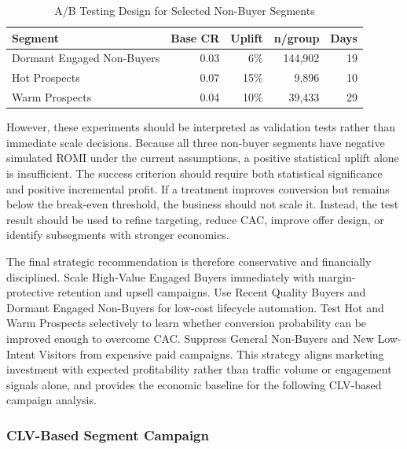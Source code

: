 \documentclass[conference]{IEEEtran}
\begin{document}
\begin{table}[H]
\centering
\caption{A/B Testing Design for Selected Non-Buyer Segments}
\label{tab:segment_ab_design}
\renewcommand{\arraystretch}{1.15}
\setlength{\tabcolsep}{3pt}
\scriptsize
\begin{tabular*}{\columnwidth}{|@{\hspace{4pt}\extracolsep{\fill}}lrrrr@{\hspace{4pt}}|}
\toprule
\textbf{Segment} & \textbf{Base CR} & \textbf{Uplift} & \textbf{n/group} & \textbf{Days} \\
\midrule
Dormant Engaged Non-Buyers & 0.03 & 6\% & 144{,}902 & 19 \\
Hot Prospects & 0.07 & 15\% & 9{,}896 & 10 \\
Warm Prospects & 0.04 & 10\% & 39{,}433 & 29 \\
\bottomrule
\end{tabular*}
\end{table}

However, these experiments should be interpreted as validation tests rather than immediate scale decisions. Because all three non-buyer segments have negative simulated ROMI under the current assumptions, a positive statistical uplift alone is insufficient. The success criterion should require both statistical significance and positive incremental profit. If a treatment improves conversion but remains below the break-even threshold, the business should not scale it. Instead, the test result should be used to refine targeting, reduce CAC, improve offer design, or identify subsegments with stronger economics.

The final strategic recommendation is therefore conservative and financially disciplined. Scale High-Value Engaged Buyers immediately with margin-protective retention and upsell campaigns. Use Recent Quality Buyers and Dormant Engaged Non-Buyers for low-cost lifecycle automation. Test Hot and Warm Prospects selectively to learn whether conversion probability can be improved enough to overcome CAC. Suppress General Non-Buyers and New Low-Intent Visitors from expensive paid campaigns. This strategy aligns marketing investment with expected profitability rather than traffic volume or engagement signals alone, and provides the economic baseline for the following CLV-based campaign analysis.


\subsubsection{CLV-Based Segment Campaign}
\end{document}
